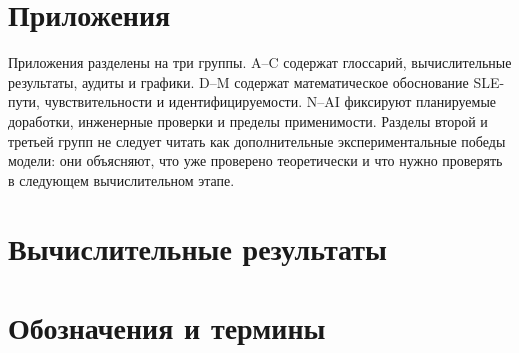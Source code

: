 \documentclass[11pt]{article}
\theoremstyle{definition}
\begin{document}
\clearpage

\appendix
\makeatletter
\renewcommand\thesection{\AlphAlph{\value{section}}}
\renewcommand\thesubsection{\thesection.\arabic{subsection}}
\renewcommand\theHsection{app.\AlphAlph{\value{section}}}
\renewcommand\theHsubsection{\theHsection.\arabic{subsection}}
\makeatother

\section*{Приложения}

Приложения разделены на три группы. A--C содержат глоссарий, вычислительные результаты, аудиты и графики. D--M содержат математическое обоснование SLE-пути, чувствительности и идентифицируемости. N--AI фиксируют планируемые доработки, инженерные проверки и пределы применимости. Разделы второй и третьей групп не следует читать как дополнительные экспериментальные победы модели: они объясняют, что уже проверено теоретически и что нужно проверять в следующем вычислительном этапе.

\section*{Вычислительные результаты}

\section{Обозначения и термины}\label{app:terms}
\end{document}
